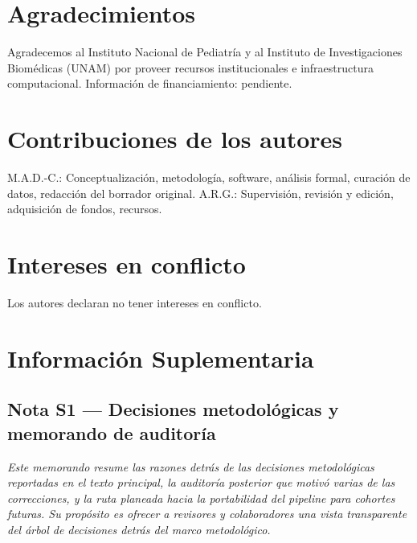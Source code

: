 \documentclass[12pt,a4paper]{article}
\begin{document}
\section*{Agradecimientos}
Agradecemos al Instituto Nacional de Pediatr\'{i}a y al Instituto de Investigaciones Biom\'{e}dicas (UNAM) por proveer recursos institucionales e infraestructura computacional. Información de financiamiento: pendiente.

\section*{Contribuciones de los autores}
M.A.D.-C.: Conceptualización, metodología, software, análisis formal, curación de datos, redacción del borrador original. A.R.G.: Supervisión, revisión y edición, adquisición de fondos, recursos.

\section*{Intereses en conflicto}
Los autores declaran no tener intereses en conflicto.




\newpage
\setcounter{section}{0}
\renewcommand{\thesection}{S\arabic{section}}
\renewcommand{\thefigure}{S\arabic{figure}}
\setcounter{figure}{0}
\section*{Información Suplementaria}

\subsection*{Nota S1 --- Decisiones metodológicas y memorando de auditoría}

\noindent\textit{Este memorando resume las razones detrás de las decisiones metodológicas reportadas en el texto principal, la auditoría posterior que motivó varias de las correcciones, y la ruta planeada hacia la portabilidad del pipeline para cohortes futuras. Su propósito es ofrecer a revisores y colaboradores una vista transparente del árbol de decisiones detrás del marco metodológico.}
\end{document}
